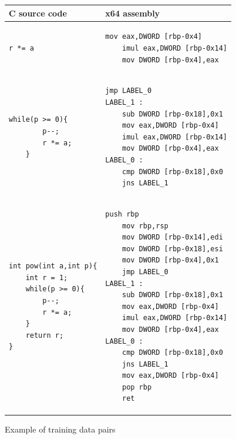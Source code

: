\documentclass[senior,final,11pt]{iscs-thesis}
\begin{document}
\begin{figure}
	\begin{tabular}{|l|l|} \hline
	 C source code & x64 assembly \\ \hline 
		\begin{lstlisting}[style=Csample]
		r *= a
		\end{lstlisting}
		&
		\begin{lstlisting}[style=Asmsample]
	mov eax,DWORD [rbp-0x4]
	imul eax,DWORD [rbp-0x14]
	mov DWORD [rbp-0x4],eax
		\end{lstlisting} \\ \hline	
		\begin{lstlisting}[style=Csample]
	while(p >= 0){
		p--;
		r *= a;
	}
		\end{lstlisting}
		&
		\begin{lstlisting}[style=Asmsample]
	jmp LABEL_0
LABEL_1 :
	sub DWORD [rbp-0x18],0x1
	mov eax,DWORD [rbp-0x4]
	imul eax,DWORD [rbp-0x14]
	mov DWORD [rbp-0x4],eax
LABEL_0 :
	cmp DWORD [rbp-0x18],0x0
	jns LABEL_1
		\end{lstlisting} \\ \hline		
		\begin{lstlisting}[style=Csample]
int pow(int a,int p){
	int r = 1;
	while(p >= 0){
		p--;
		r *= a;
	}
	return r;
}
		\end{lstlisting}
		&
		\begin{lstlisting}[style=Asmsample]
	push rbp
	mov rbp,rsp
	mov DWORD [rbp-0x14],edi
	mov DWORD [rbp-0x18],esi
	mov DWORD [rbp-0x4],0x1
	jmp LABEL_0
LABEL_1 :
	sub DWORD [rbp-0x18],0x1
	mov eax,DWORD [rbp-0x4]
	imul eax,DWORD [rbp-0x14]
	mov DWORD [rbp-0x4],eax
LABEL_0 :
	cmp DWORD [rbp-0x18],0x0
	jns LABEL_1
	mov eax,DWORD [rbp-0x4]
	pop rbp
	ret
		\end{lstlisting} \\ \hline
	\end{tabular}
	\caption{Example of training data pairs}
	\label{fig:pairsoffragments}
\end{figure}
\end{document}
